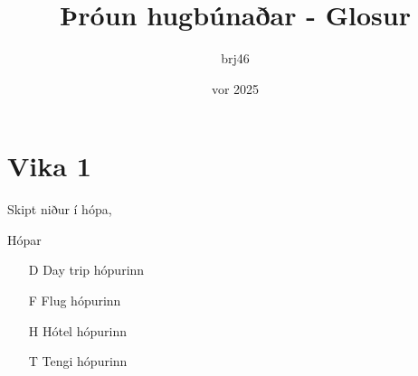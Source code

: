 \documentclass{article}
\title{Þróun hugbúnaðar - Glosur}
\author{brj46 }
\date{vor 2025}
\begin{document}
\maketitle

\section{Vika 1}

Skipt niður í hópa,

Hópar 
\begin{itemize}
    \item[D] Day trip hópurinn
    \item[F] Flug hópurinn
    \item[H] Hótel hópurinn
    \item[T] Tengi hópurinn  
\end{itemize}
\end{document}
